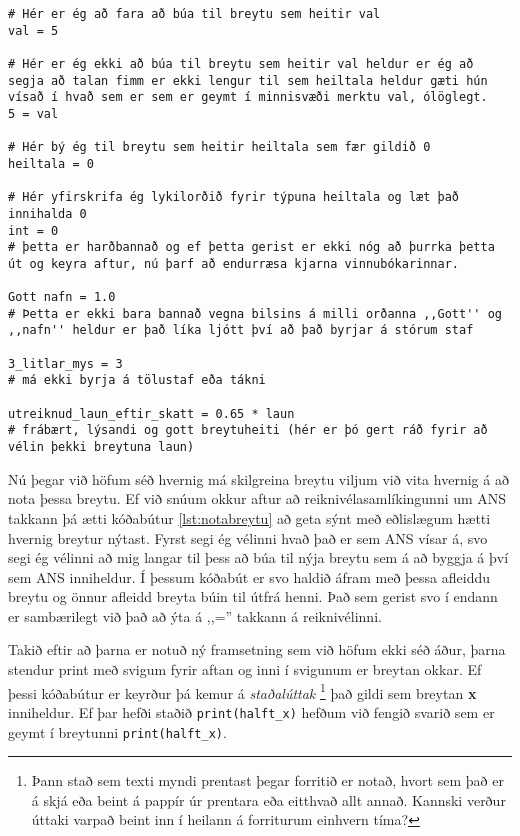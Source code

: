 \begin{lstlisting}[caption=Dæmi um gildisvetingar\, réttar og rangar]
# Hér er ég að fara að búa til breytu sem heitir val
val = 5

# Hér er ég ekki að búa til breytu sem heitir val heldur er ég að segja að talan fimm er ekki lengur til sem heiltala heldur gæti hún vísað í hvað sem er sem er geymt í minnisvæði merktu val, ólöglegt.
5 = val

# Hér bý ég til breytu sem heitir heiltala sem fær gildið 0
heiltala = 0

# Hér yfirskrifa ég lykilorðið fyrir týpuna heiltala og læt það innihalda 0
int = 0
# þetta er harðbannað og ef þetta gerist er ekki nóg að þurrka þetta út og keyra aftur, nú þarf að endurræsa kjarna vinnubókarinnar.

Gott nafn = 1.0
# Þetta er ekki bara bannað vegna bilsins á milli orðanna ,,Gott'' og ,,nafn'' heldur er það líka ljótt því að það byrjar á stórum staf

3_litlar_mys = 3
# má ekki byrja á tölustaf eða tákni

utreiknud_laun_eftir_skatt = 0.65 * laun
# frábært, lýsandi og gott breytuheiti (hér er þó gert ráð fyrir að vélin þekki breytuna laun)
\end{lstlisting}

Nú þegar við höfum séð hvernig má skilgreina breytu viljum við vita hvernig á að nota þessa breytu.
Ef við snúum okkur aftur að reiknivélasamlíkingunni um ANS takkann þá ætti kóðabútur \ref{lst:notabreytu} að geta sýnt með eðlislægum hætti hvernig breytur nýtast.
Fyrst segi ég vélinni hvað það er sem ANS vísar á, svo segi ég vélinni að mig langar til þess að búa til nýja breytu sem á að byggja á því sem ANS inniheldur.
Í þessum kóðabút er svo haldið áfram með þessa afleiddu breytu og önnur afleidd breyta búin til útfrá henni.
Það sem gerist svo í endann er sambærilegt við það að ýta á ,,='' takkann á reiknivélinni.

Takið eftir að þarna er notuð ný framsetning sem við höfum ekki séð áður, þarna stendur print með svigum fyrir aftan og inni í svigunum er breytan okkar.
Ef þessi kóðabútur er keyrður þá kemur á \textit{staðalúttak} 
\footnote{Þann stað sem texti myndi prentast þegar forritið er notað, hvort sem það er á skjá eða beint á pappír úr prentara eða eitthvað allt annað. Kannski verður úttaki varpað beint inn í heilann á forriturum einhvern tíma?} 
það gildi sem breytan \textbf{x} inniheldur.
Ef þar hefði staðið \texttt{print(halft\_x)} hefðum við fengið svarið sem er geymt í breytunni \texttt{print(halft\_x)}.

